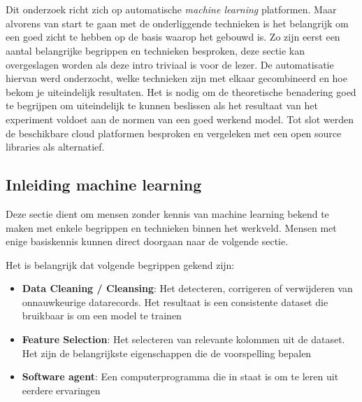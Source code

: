 \chapter{}
\label{ch:stand-van-zaken}



Dit onderzoek richt zich op automatische \textit{machine learning} platformen. Maar alvorens van start te gaan met de onderliggende technieken is het belangrijk om een goed zicht te hebben op de basis waarop het gebouwd is. Zo zijn eerst een aantal belangrijke begrippen en technieken besproken, deze sectie kan overgeslagen worden als deze intro triviaal is voor de lezer. De automatisatie hiervan werd onderzocht, welke technieken zijn met elkaar gecombineerd en hoe bekom je uiteindelijk resultaten. Het is nodig om de theoretische benadering goed te begrijpen om uiteindelijk te kunnen beslissen als het resultaat van het experiment voldoet aan de normen van een goed werkend model. Tot slot werden de beschikbare cloud platformen besproken en vergeleken met een open source libraries als alternatief.

\section{Inleiding machine learning}
\label{sec:inl-machine-learning}

Deze sectie dient om mensen zonder kennis van machine learning bekend te maken met enkele begrippen en technieken binnen het werkveld. Mensen met enige basiskennis kunnen direct doorgaan naar de volgende sectie.

Het is belangrijk dat volgende begrippen gekend zijn:
\begin{itemize}
    \item \textbf{Data Cleaning / Cleansing}: Het detecteren, corrigeren of verwijderen van onnauwkeurige datarecords. Het resultaat is een consistente dataset die bruikbaar is om een model te trainen
    \item \textbf{Feature Selection}: Het selecteren van relevante kolommen uit de dataset. Het zijn de belangrijkste eigenschappen die de voorspelling bepalen
    \item \textbf{Software agent}: Een computerprogramma die in staat is om te leren uit eerdere ervaringen
\end{itemize}

